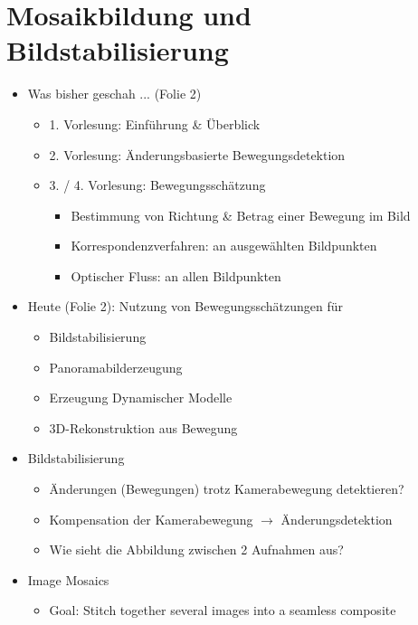 \documentclass{report}
\begin{document}
	
	\section{Mosaikbildung und Bildstabilisierung}
	
	\begin{itemize}
		\item Was bisher geschah ... (Folie 2)
		\begin{itemize}
			\item 1. Vorlesung: Einführung \& Überblick
			\item 2. Vorlesung: Änderungsbasierte Bewegungsdetektion
			\item 3. / 4. Vorlesung: Bewegungsschätzung
			\begin{itemize}
				\item Bestimmung von Richtung \& Betrag einer Bewegung im Bild
				\item Korrespondenzverfahren: an ausgewählten Bildpunkten
				\item Optischer Fluss: an allen Bildpunkten
			\end{itemize}
			
		\end{itemize}
		
		\item Heute (Folie 2): Nutzung von Bewegungsschätzungen für
		\begin{itemize}
			\item Bildstabilisierung
			\item Panoramabilderzeugung
			\item Erzeugung Dynamischer Modelle
			\item 3D-Rekonstruktion aus Bewegung
		\end{itemize}
		
		\item Bildstabilisierung
		\begin{itemize}
			\item Änderungen (Bewegungen) trotz Kamerabewegung detektieren?
			\item Kompensation der Kamerabewegung $\rightarrow$ Änderungsdetektion
			\item Wie sieht die Abbildung zwischen 2 Aufnahmen aus?
		\end{itemize}
		
		\item Image Mosaics
		\begin{itemize}
			\item Goal: Stitch together several images into a seamless composite
		\end{itemize}
		

\end{itemize}
\end{document}
